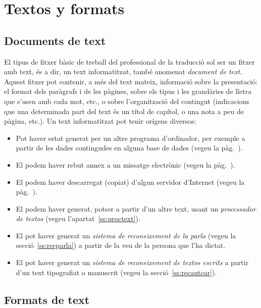 \chapter{Textos y formats}
\label{se:EPT}

\section{Documents de text}

El tipus de fitxer bàsic de treball del professional de la traducció
sol ser un fitxer amb text, és a dir, un text informatitzat, també
anomenat \emph{document de text}. Aquest fitxer pot contenir, a més
del text mateix, informació sobre la presentació: el format dels
paràgrafs i de les pàgines, sobre els tipus i les grandàries de lletra
que s'usen amb cada mot, etc., o sobre l'organització del contingut
(indicacions que una determinada part del text és un títol de capítol,
o una nota a peu de pàgina, etc.).  Un text informatitzat pot tenir
orígens diversos:
\begin{itemize}
\item Pot haver estat generat per un altre programa d'ordinador, per
  exemple a partir de les dades contingudes en alguna base de dades
  (vegeu la pàg.~\pageref{pg:BD}).
\item El podem haver rebut annex a un missatge electrònic (vegeu la
  pàg.~\pageref{pg:annex}).
\item El podem haver descarregat (copiat) d'algun servidor d'Internet
  (vegeu la pàg.~\pageref{pg:ftp}).
\item El podem haver generat, potser a partir d'un altre
  text, usant un \emph{processador de textos} (vegeu
  l'apartat~\ref{ss:proctext}).
\item El pot haver generat un \emph{sistema de reconeixement de la parla}
  (vegeu la secció~\ref{ss:recparla}) a
  partir de la veu de la persona que l'ha dictat.
\item El pot haver generat un \emph{sistema de reconeixement de
    textos escrits} a partir d'un text tipografiat o manuscrit (vegeu la
  secció~\ref{ss:recautcar}).
\end{itemize}

\section{Formats de text}
\label{ss:formats}


